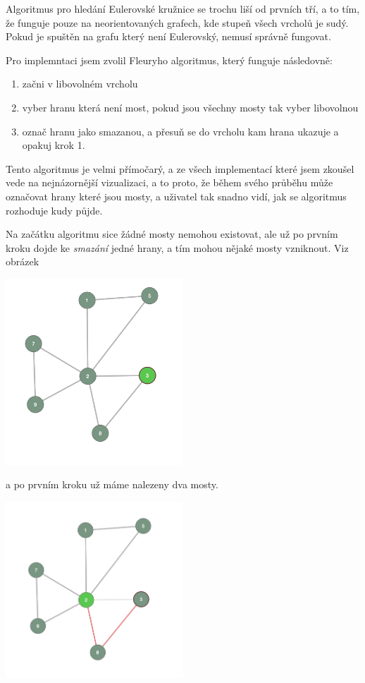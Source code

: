 \documentclass{article}
\begin{document}
Algoritmus pro hledání Eulerovské kružnice se trochu liší od prvních
tří, a to tím, že funguje pouze na neorientovaných grafech, kde stupeň
všech vrcholů je sudý. Pokud je spuštěn na grafu který není Eulerovský,
nemusí správně fungovat.

Pro implemntaci jsem zvolil Fleuryho algoritmus, který funguje následovně:

\begin{enumerate}
  \item začni v libovolném vrcholu
  \item vyber hranu která není most, pokud jsou všechny mosty tak vyber libovolnou
  \item označ hranu jako smazanou, a přesuň se do vrcholu kam hrana ukazuje a opakuj krok 1.
\end{enumerate}

Tento algoritmus je velmi přímočarý, a ze všech implementací které jsem
zkoušel vede na nejnázornější vizualizaci, a to proto, že během svého
průběhu může označovat hrany které jsou mosty, a uživatel tak snadno
vidí, jak se algoritmus rozhoduje kudy půjde.

Na začátku algoritmu sice žádné mosty nemohou existovat, ale už po
prvním kroku dojde ke \emph{smazání} jedné hrany, a tím mohou nějaké mosty
vzniknout. Viz obrázek

\begin{center}
    \includegraphics[width=0.5\textwidth]{95ubo0l.png}
\end{center}
\vspace{10pt}

a po prvním kroku už máme nalezeny dva mosty.

\vspace{10pt}
\begin{center}
    \includegraphics[width=0.5\textwidth]{Ls741t3.png}
\end{center}
\vspace{10pt}
\end{document}
